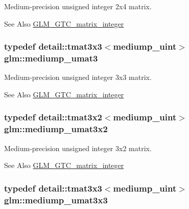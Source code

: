 Medium-\/precision unsigned integer 2x4 matrix. 

\begin{DoxySeeAlso}{See Also}
\hyperlink{group__gtc__matrix__integer}{G\-L\-M\-\_\-\-G\-T\-C\-\_\-matrix\-\_\-integer} 
\end{DoxySeeAlso}
\hypertarget{group__gtc__matrix__integer_ga126ed770ed9106de1441a5a788e6485d}{
\subsubsection[{mediump\-\_\-umat3}]{\setlength{\rightskip}{0pt plus 5cm}typedef detail\-::tmat3x3$<$mediump\-\_\-uint$>$ {\bf glm\-::mediump\-\_\-umat3}}}\label{group__gtc__matrix__integer_ga126ed770ed9106de1441a5a788e6485d}


Medium-\/precision unsigned integer 3x3 matrix. 

\begin{DoxySeeAlso}{See Also}
\hyperlink{group__gtc__matrix__integer}{G\-L\-M\-\_\-\-G\-T\-C\-\_\-matrix\-\_\-integer} 
\end{DoxySeeAlso}
\hypertarget{group__gtc__matrix__integer_gaa8022553d8ad1a133f9ebe75a50dbee1}{
\subsubsection[{mediump\-\_\-umat3x2}]{\setlength{\rightskip}{0pt plus 5cm}typedef detail\-::tmat3x2$<$mediump\-\_\-uint$>$ {\bf glm\-::mediump\-\_\-umat3x2}}}\label{group__gtc__matrix__integer_gaa8022553d8ad1a133f9ebe75a50dbee1}


Medium-\/precision unsigned integer 3x2 matrix. 

\begin{DoxySeeAlso}{See Also}
\hyperlink{group__gtc__matrix__integer}{G\-L\-M\-\_\-\-G\-T\-C\-\_\-matrix\-\_\-integer} 
\end{DoxySeeAlso}
\hypertarget{group__gtc__matrix__integer_ga51665c5e422b057ca25a67a939c78ceb}{
\subsubsection[{mediump\-\_\-umat3x3}]{\setlength{\rightskip}{0pt plus 5cm}typedef detail\-::tmat3x3$<$mediump\-\_\-uint$>$ {\bf glm\-::mediump\-\_\-umat3x3}}}\label{group__gtc__matrix__integer_ga51665c5e422b057ca25a67a939c78ceb}



